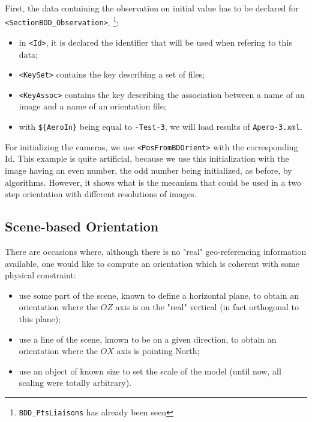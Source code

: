 First, the data containing the observation on initial value has
to be declared for  {\tt  <SectionBDD\_Observation>}.
\footnote { {\tt BDD\_PtsLiaisons} has already been seen}:

\begin{itemize}
   \item  in {\tt <Id>}, it is declared the identifier that will be used when
         refering to this data;
    \item {\tt <KeySet>} contains the key describing a set of files;
    \item {\tt <KeyAssoc>} contains the key describing  the association
         between a name of an image and a name of an orientation file;

     \item with {\tt \$\{AeroIn\}} being equal to {\tt -Test-3}, 
          we will load results of {\tt Apero-3.xml}.
\end{itemize}

For initializing the cameras, we use {\tt <PosFromBDOrient>} with
the corresponding Id. This example is quite  artificial, because
we use this initialization with the image having an even number, the
odd number being initialized, as before, by  algorithms. However,
it shows what is the mecanism that could be used in a two step orientation
with different resolutions of images.


\subsection{Scene-based Orientation}

\label{SC:Base:Or}

There are occasions where, although there is no "real" geo-referencing 
information available, one would like to compute an orientation which is coherent with
some physical constraint:


\begin{itemize}

   \item  use some part of the scene, known to define a horizontal plane, to 
          obtain an orientation where the $OZ$ axis is on the "real" vertical (in 
          fact orthogonal to this plane);

   \item  use a line of the scene, known to be on a given direction,  to
          obtain an orientation where the $OX$ axis is pointing North;

   \item  use an object of known size to set the scale of the model
          (until now, all scaling were totally arbitrary).
\end{itemize}

